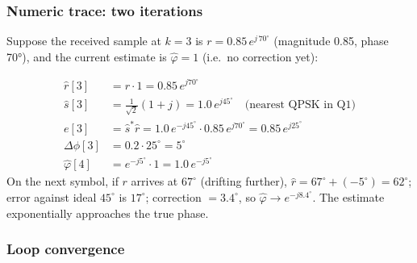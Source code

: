 \documentclass[11pt,a4paper]{article}
\begin{document}
\subsubsection*{Numeric trace: two iterations}

Suppose the received sample at $k = 3$ is
$r = 0.85\,e^{j\,70^\circ}$ (magnitude 0.85, phase 70°), and the current
estimate is $\hat\varphi = 1$ (i.e.\ no correction yet):

\begin{align*}
\hat r[3] &= r \cdot 1 = 0.85\,e^{j 70^\circ} \\
\hat s[3] &= \tfrac{1}{\sqrt 2}(1 + j) = 1.0\,e^{j 45^\circ}
             \quad\text{(nearest QPSK in Q1)}\\
e[3]      &= \hat s^\ast \hat r = 1.0\,e^{-j 45^\circ}\cdot 0.85\,e^{j 70^\circ}
           = 0.85\,e^{j 25^\circ} \\
\Delta\phi[3] &= 0.2 \cdot 25^\circ = 5^\circ \\
\hat\varphi[4] &= e^{-j 5^\circ}\cdot 1 = 1.0\,e^{-j 5^\circ}
\end{align*}
On the next symbol, if $r$ arrives at $67^\circ$ (drifting further),
$\hat r = 67^\circ + (-5^\circ) = 62^\circ$; error against ideal $45^\circ$
is $17^\circ$; correction $= 3.4^\circ$, so $\hat\varphi \to e^{-j
8.4^\circ}$. The estimate exponentially approaches the true phase.

\subsubsection*{Loop convergence}
\end{document}
